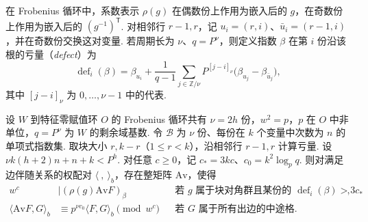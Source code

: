 在 Frobenius 循环中，系数表示 $\rho(g)$ 在偶数份上作用为嵌入后的 $g$，在奇数份上作用为嵌入后的 $(g^{-1})^{\mathsf T}$. 对相邻行 $r-1,r$，记 $u_i=(r,i)$、$\bar u_i=(r-1,i)$，并在奇数份交换这对变量. 若周期长为 $\nu$、$q=P^\nu$，则定义指数 $\beta$ 在第 $i$ 份沿该根的亏量（\emph{defect}）为
\[
 \operatorname{def}_i(\beta)
   =\beta_{u_i}+\frac1{q-1}\sum_{j\in\mathbb Z/\nu}
        P^{[j-i]_\nu}\bigl(\beta_{u_j}-\beta_{\bar u_j}\bigr),
\]
其中 $[j-i]_\nu$ 为 $0,\ldots,\nu-1$ 中的代表.

\begin{lemma}
\label{lem:a-edge-average}
\emitthmsource
设 $W$ 到特征零赋值环 $O$ 的 Frobenius 循环共有 $\nu=2h$ 份，$w^2=p$，$p$ 在 $O$ 中非单位，$q=P^\nu$ 为 $W$ 的剩余域基数.
令 $\mathcal B$ 为 $\nu$ 份、每份在 $k$ 个变量中次数为 $n$ 的单项式指数集.
取块大小 $r,k-r$（$1\le r<k$），沿相邻行 $r-1,r$ 计算亏量.
设 $\nu k(h+2)n+n+k<P^h$. 对任意 $c\ge0$，记 $c_\ast=3kc$、$c_0=k^2\log_p q$.
则对满足边伴随关系的权配对 $\langle\ ,\ \rangle_b$，存在整矩阵 $\mathrm{Av}$，使得
\[
 \begin{aligned}
 w^c&\mid (\rho(g)\mathrm{Av} F)_\beta
     &&\text{若 $g$ 属于块对角群且某份的 $\operatorname{def}_i(\beta)>3c_\ast$},\\
 \langle\mathrm{Av} F,G\rangle_b
   &\equiv p^{\nu c_0}\langle F,G\rangle_b \pmod{w^c}
     &&\text{若 $G$ 属于所有出边的中途格}.
 \end{aligned}
\]
\end{lemma}

